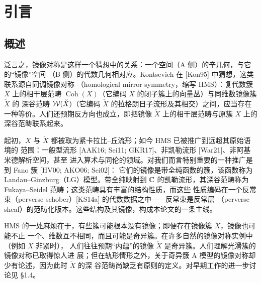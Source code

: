 \section{引言}

\subsection{概述}

泛言之，镜像对称是这样一个猜想中的关系：一个空间（A 侧）的辛几何，与它的“镜像”空间
（B 侧）的代数几何相对应。Kontsevich 在 [Kon95] 中猜想，这类联系源自同调镜像对称
（homological mirror symmetry，缩写 HMS）：复代数簇 $X$ 上的相干层范畴
$\operatorname{Coh}(X)$（它编码 $X$ 的闭子簇上的向量丛）与同维数镜像簇 $\check X$ 的
深谷范畴 $\mathcal{W}(\check X)$（它编码 $\check X$ 的拉格朗日子流形及其相交）之间，应当存在
一种等价。人们还预期反方向也成立，即把镜像 $\check X$ 上的相干层范畴与原簇 $X$ 上的
深谷范畴联系起来。


起初，$X$ 与 $\check X$ 都被取为紧卡拉比–丘流形；如今 HMS 已被推广到远超其原始语境的
范围：一般型流形 [AAK16; Sei11; GKR17]、非凯勒流形 [War21]、非阿基米德解析空间，甚至
进入算术与同伦的领域。对我们而言特别重要的一种推广是到 Fano 簇 [HV00; AKO06; Sei02]：
它们的镜像是带全纯函数的簇，该函数称为 Landau--Ginzburg（LG）模型。带全纯映射到 $\mathbb{C}$
的凯勒流形，其深谷范畴称为 Fukaya--Seidel 范畴；这类范畴具有丰富的结构性质，而这些
性质编码在一个反常束（perverse schober）[KS14a] 的代数数据之中——反常束是反常层
（perverse sheaf）的范畴化版本。这些结构及其镜像，构成本论文的一条主线。


HMS 的一处麻烦在于，有些簇可能根本没有镜像；即便存在镜像簇 $\check X$，镜像也可能不止
一个、维数互不相同，而且可能是奇异簇。在许多自然的镜像对称实例中（例如 $X$ 非紧时），
人们往往预期“内蕴”的镜像 $\check X$ 是奇异簇。人们理解光滑簇的镜像对称已取得惊人进
展；但在轨形情形之外，关于奇异簇 A 模型的镜像对称却少有论述，因为此时 $\check X$ 的深
谷范畴尚缺乏有原则的定义。对早期工作的进一步讨论见 §1.4。


